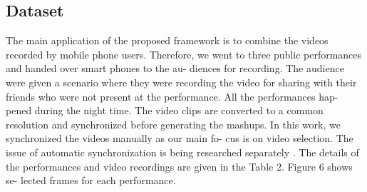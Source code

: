 \documentclass{sig-alternate}
\begin{document}







\subsection{Dataset}
The main application of the proposed framework is to combine
the videos recorded by mobile phone users. Therefore, we went to
three public performances and handed over smart phones to the au-
diences for recording. The audience were given a scenario where
they were recording the video for sharing with their friends who
were not present at the performance. All the performances hap-
pened during the night time. The video clips are converted to a
common resolution and synchronized before generating the mashups.
In this work, we synchronized the videos manually as our main fo-
cus is on video selection. The issue of automatic synchronization is
being researched separately \cite{14}. The details of the performances
and video recordings are given in the Table 2. Figure 6 shows se-
lected frames for each performance.
\end{document}
